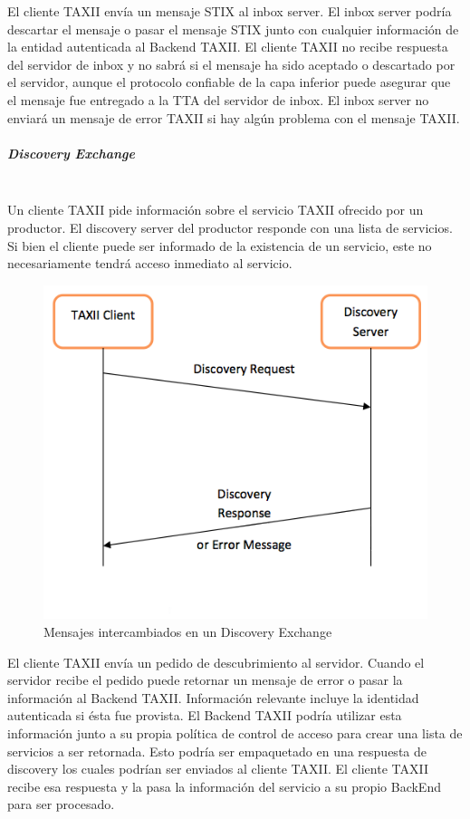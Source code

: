 El cliente TAXII envía un mensaje STIX al inbox server. El inbox server podría 
descartar el mensaje o pasar el mensaje STIX junto con cualquier información de 
la entidad autenticada al Backend TAXII. El cliente TAXII no recibe respuesta 
del servidor de inbox y no sabrá si el mensaje ha sido aceptado o descartado por 
el servidor, aunque el protocolo confiable de la capa inferior puede asegurar 
que el mensaje fue entregado a la TTA del servidor de inbox. El inbox server no 
enviará un mensaje de error TAXII si hay algún problema con el mensaje TAXII.

\subparagraph{Discovery Exchange}\ \\

Un cliente TAXII pide información sobre el servicio TAXII ofrecido por un 
productor. El discovery server del productor responde con una lista de 
servicios. Si bien el cliente puede ser informado de la existencia de un 
servicio, este no necesariamente tendrá acceso inmediato al servicio.\\

\begin{figure}[ht!]
  \centering
    \includegraphics[width=150mm]{./images/DiscoveryExchange.png}
     \caption{Mensajes intercambiados en un Discovery Exchange \protect\cite{b1}}
\end{figure}

El cliente TAXII envía un pedido de descubrimiento al servidor. Cuando el 
servidor recibe el pedido puede retornar un mensaje de error o pasar la 
información al Backend TAXII. Información relevante incluye la identidad 
autenticada si ésta fue provista. El Backend TAXII podría utilizar esta 
información junto a su propia política de control de acceso  para crear una 
lista de servicios a ser retornada. Esto podría ser empaquetado en una 
respuesta de discovery los cuales podrían ser enviados al cliente TAXII. El 
cliente TAXII recibe esa respuesta y la pasa la información del servicio a su 
propio BackEnd para ser procesado.

